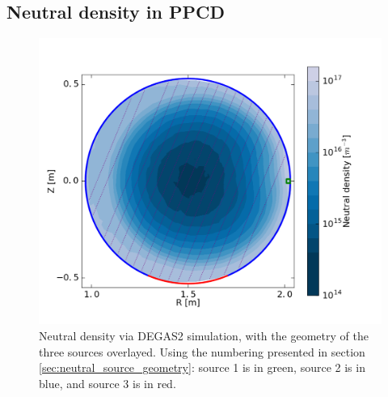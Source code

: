 \subsection{Neutral density in PPCD}

\begin{figure}
    \centering
    \includegraphics{ion_transport_results/DEGAS2_density2d.png}
    \caption[Neutral density via DEGAS2]{Neutral density via DEGAS2 simulation, with the geometry of the three sources overlayed. Using the numbering presented in section \ref{sec:neutral_source_geometry}: source 1 is in green, source 2 is in blue, and source 3 is in red. }
    \label{fig:DEGAS2_sources_and_density}
\end{figure}


